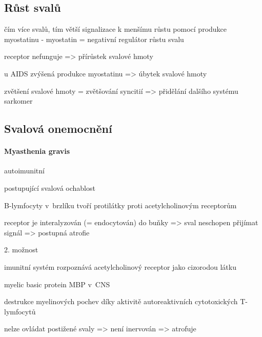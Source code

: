 \documentclass[DIV=8]{scrreprt}
\begin{document}
\subsection{Růst svalů} \label{Růst svalů}


\begin{myItemize}[nosep]
    \item čím více svalů, tím větší signalizace k menšímu růstu pomocí produkce myostatinu - myostatin = negativní regulátor růstu svalu
\begin{myItemize}[nosep]
    \item receptor nefunguje => přírůstek svalové hmoty
\end{myItemize}

    \item u AIDS zvýšená produkce myostatinu => úbytek svalové hmoty
    \item zvětšení svalové hmoty = zvětšování syncitií => přidělání dalšího systému sarkomer
\end{myItemize}



\subsection{Svalová onemocnění} \label{Svalová onemocnění}


\paragraph{Myasthenia gravis}
\begin{myItemize}[nosep]
    \item autoimunitní
    \item postupující svalová ochablost
    \item B-lymfocyty v brzlíku tvoří protilátky proti acetylcholinovým receptorům
    \item receptor je interalyzován (= endocytován) do buňky => sval neschopen přijímat signál => postupná atrofie
    \item 2. možnost
\begin{myItemize}[nosep]
    \item imunitní systém rozpoznává acetylcholinový receptor jako cizorodou látku
    \item myelic basic protein MBP v CNS
    \item destrukce myelinových pochev díky aktivitě autoreaktivních cytotoxických T-lymfocytů
    \item nelze ovládat postižené svaly => není inervován => atrofuje
\end{myItemize}

\end{myItemize}
\end{document}
